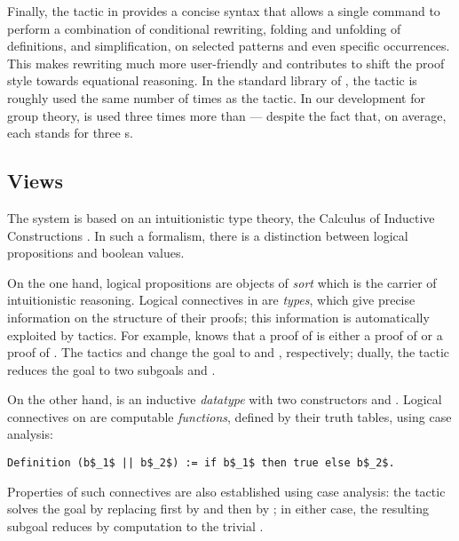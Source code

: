 Finally, the  tactic in \ssr{} provides a concise syntax
that allows a single command to perform a combination of conditional
rewriting, folding and unfolding of definitions, and simplification,
on selected patterns and even specific occurrences.
This makes rewriting much more user-friendly 
and contributes to shift the proof style towards equational reasoning.
In the standard library of \Coq, the  tactic is roughly
used the same number of times as the  tactic.
In our development for group theory,  is used three times more than
 --- despite the fact that, on average, each \ssr{} 
stands for three \Coq{} s.

\subsection{Views}\label{ssec:ssr}

The \Coq{} system is based on an intuitionistic type theory, the Calculus
of Inductive Constructions \cite{werner,paulin}. In such a formalism, there is 
a distinction between logical propositions and boolean values.

On the one hand, logical propositions are objects
of \emph{sort}  which is the carrier of intuitionistic
reasoning. Logical connectives in  are \emph{types}, which give precise
information on the structure of their proofs; this information is
automatically exploited by \Coq{} tactics. For example, \Coq{} knows that a
proof of  is either a proof of  or a proof of .
The tactics  and  change the goal 
to  and , respectively; dually, the tactic  reduces the goal
 to two subgoals  and .

On the other hand,  is an inductive \emph{datatype}
with two constructors  and .
Logical connectives on  are computable \emph{functions}, defined by
their truth tables, using case analysis:
\begin{lstlisting}
Definition (b$_1$ || b$_2$) := if b$_1$ then true else b$_2$.
\end{lstlisting}
Properties of such connectives are also established using case
analysis: the tactic  solves the goal 
by replacing  first by  and then by ; in either case,
the resulting subgoal reduces by computation to the trivial
.

